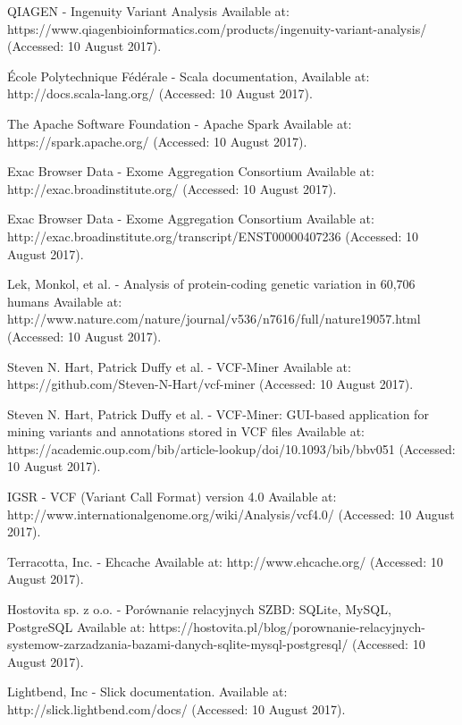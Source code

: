 \documentclass[a4paper,12pt,twoside]{article}
\begin{document}
\newpage
\begin{thebibliography}{99}

QIAGEN - Ingenuity Variant Analysis
Available at: https://www.qiagenbioinformatics.com/products/ingenuity-variant-analysis/ (Accessed: 10 August 2017).

École Polytechnique Fédérale - Scala documentation,
Available at: http://docs.scala-lang.org/ (Accessed: 10 August 2017).

The Apache Software Foundation - Apache Spark Available at: https://spark.apache.org/ (Accessed: 10 August 2017).

Exac Browser Data - Exome Aggregation Consortium  
Available at: http://exac.broadinstitute.org/ (Accessed: 10 August 2017).

Exac Browser Data - Exome Aggregation Consortium  
Available at: http://exac.broadinstitute.org/transcript/ENST00000407236 (Accessed: 10 August 2017).

Lek, Monkol, et al. - Analysis of protein-coding genetic variation in 60,706 humans
Available at: http://www.nature.com/nature/journal/v536/n7616/full/nature19057.html
(Accessed: 10 August 2017).

Steven N. Hart, Patrick Duffy et al. - VCF-Miner 
Available at: https://github.com/Steven-N-Hart/vcf-miner (Accessed: 10 August 2017).

Steven N. Hart, Patrick Duffy et al. - VCF-Miner: GUI-based application for mining variants and annotations stored in VCF files 
Available at: https://academic.oup.com/bib/article-lookup/doi/10.1093/bib/bbv051 (Accessed: 10 August 2017).

IGSR  - VCF (Variant Call Format) version 4.0
Available at: http://www.internationalgenome.org/wiki/Analysis/vcf4.0/ (Accessed: 10 August 2017).

Terracotta, Inc. - Ehcache 
Available at: http://www.ehcache.org/ (Accessed: 10 August 2017).

Hostovita sp. z o.o. - Porównanie relacyjnych SZBD: SQLite, MySQL, PostgreSQL
Available at:
https://hostovita.pl/blog/porownanie-relacyjnych-systemow-zarzadzania-bazami-danych-sqlite-mysql-postgresql/ (Accessed: 10 August 2017).

Lightbend, Inc - Slick documentation. Available at:
http://slick.lightbend.com/docs/ (Accessed: 10 August 2017).


\end{thebibliography}
\end{document}
